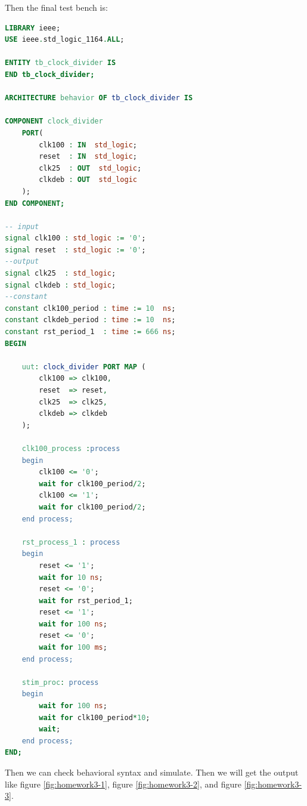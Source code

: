 \documentclass{article}
\begin{document}
    Then the final test bench is:
    \begin{lstlisting}[language=VHDL,caption=Clock Unit Test Bench]
LIBRARY ieee;
USE ieee.std_logic_1164.ALL;

ENTITY tb_clock_divider IS
END tb_clock_divider;

ARCHITECTURE behavior OF tb_clock_divider IS 

COMPONENT clock_divider
    PORT(
        clk100 : IN  std_logic;
        reset  : IN  std_logic;
        clk25  : OUT  std_logic;
        clkdeb : OUT  std_logic
    );
END COMPONENT;

-- input
signal clk100 : std_logic := '0';
signal reset  : std_logic := '0';
--output
signal clk25  : std_logic;
signal clkdeb : std_logic;
--constant
constant clk100_period : time := 10  ns;
constant clkdeb_period : time := 10  ns;
constant rst_period_1  : time := 666 ns;
BEGIN

    uut: clock_divider PORT MAP (
        clk100 => clk100,
        reset  => reset,
        clk25  => clk25,
        clkdeb => clkdeb
    );

    clk100_process :process
    begin
        clk100 <= '0';
        wait for clk100_period/2;
        clk100 <= '1';
        wait for clk100_period/2;
    end process;

    rst_process_1 : process
    begin
        reset <= '1';
        wait for 10 ns;
        reset <= '0';
        wait for rst_period_1;
        reset <= '1';
        wait for 100 ns;
        reset <= '0';
        wait for 100 ms;
    end process;

    stim_proc: process
    begin	
        wait for 100 ns;	
        wait for clk100_period*10;
        wait;
    end process;
END;
    \end{lstlisting}
        
    Then we can check behavioral syntax and simulate. Then we will get the output like figure \ref{fig:homework3-1},
    figure \ref{fig:homework3-2}, and figure \ref{fig:homework3-3}.
    
\end{document}
